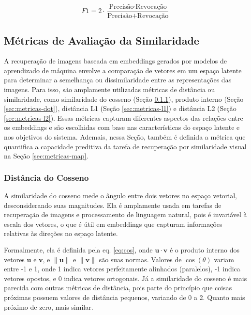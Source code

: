 \begin{equation}\label{eq:f1}
  F1 = 2 \cdot \frac{\text{Precisão} \cdot \text{Revocação}}{\text{Precisão} + \text{Revocação}}
\end{equation}






\subsection{Métricas de Avaliação da Similaridade}
\label{sec:metricas-sim}

A recuperação de imagens baseada em embeddings gerados por modelos de aprendizado de máquina envolve a comparação de vetores em um espaço latente para determinar a semelhança ou dissimilaridade entre as representações das imagens. Para isso, são amplamente utilizadas métricas de distância ou similaridade, como similaridade do cosseno (Seção \ref{sec:metricas-cos}), produto interno (Seção \ref{sec:metricas-dot}), distância L1 (Seção \ref{sec:metricas-l1}) e distância L2 (Seção \ref{sec:metricas-l2}). Essas métricas capturam diferentes aspectos das relações entre os embeddings e são escolhidas com base nas características do espaço latente e nos objetivos do sistema. Ademais, nessa Seção, também é definida a métrica que quantifica a capacidade preditiva da tarefa de recuperação por similaridade visual na Seção \ref{sec:metricas-map}.


\subsubsection{Distância do Cosseno}
\label{sec:metricas-cos}

A similaridade do cosseno mede o ângulo entre dois vetores no espaço vetorial, desconsiderando suas magnitudes. Ela é amplamente usada em tarefas de recuperação de imagens e processamento de linguagem natural, pois é invariável à escala dos vetores, o que é útil em embeddings que capturam informações relativas às direções no espaço latente.

Formalmente, ela é definida pela eq. \eqref{eq:cos}, onde \( \mathbf{u} \cdot \mathbf{v} \) é o produto interno dos vetores \( \mathbf{u} \) e \( \mathbf{v} \), e \( \|\mathbf{u}\| \) e \( \|\mathbf{v}\| \) são suas normas. Valores de $\cos(\theta)$ variam entre -1 e 1, onde 1 indica vetores perfeitamente alinhados (paralelos), -1 indica vetores opostos, e 0 indica vetores ortogonais. Já a similaridade do cosseno é mais parecida com outras métricas de distância, pois parte do princípio que coisas próximas possuem valores de distância pequenos, variando de 0 a 2. Quanto mais próximo de zero, mais similar.

